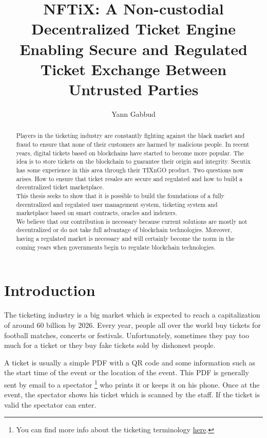 \documentclass[a4paper,11pt,oneside]{report}
\title{NFTiX: A Non-custodial Decentralized Ticket Engine Enabling Secure and Regulated Ticket Exchange Between Untrusted Parties}
\author{Yann Gabbud}
\affiliation{Distributed Computing Laboratory \\
and \\
Secutix SA, an ELCA company \\}
\begin{document}
\maketitle
\makeacks

\begin{abstract}
Players in the ticketing industry are constantly fighting against the black market and fraud to ensure that none of their customers are harmed by malicious people. In recent years, digital tickets based on blockchains have started to become more popular. The idea is to store tickets on the blockchain to guarantee their origin and integrity. Secutix has some experience in this area through their TIXnGO product. Two questions now arises. How to ensure that ticket resales are secure and regulated and how to build a decentralized ticket marketplace. \\

This thesis seeks to show that it is possible to build the foundations of a fully decentralized and regulated user management system, ticketing system and marketplace based on smart contracts, oracles and indexers. \\

We believe that our contribution is necessary because current solutions are mostly not decentralized or do not take full advantage of blockchain technologies. Moreover, having a regulated market is necessary and will certainly become the norm in the coming years when governments begin to regulate blockchain technologies. \\
\end{abstract}

\maketoc

\chapter{Introduction}
The ticketing industry is a big market which is expected to reach a capitalization of around 60 billion by 2026. Every year, people all over the world buy tickets for football matches, concerts or festivals. Unfortunately, sometimes they pay too much for a ticket or they buy fake tickets sold by dishonest people.

A ticket is usually a simple PDF with a QR code and some information such as the start time of the event or the location of the event. This PDF is generally sent by email to a spectator \footnote{You can find more info about the ticketing terminology \hyperref[sec:ticketing_terminology]{here}.} who prints it or keeps it on his phone. Once at the event, the spectator shows his ticket which is scanned by the staff. If the ticket is valid the spectator can enter.
\end{document}
